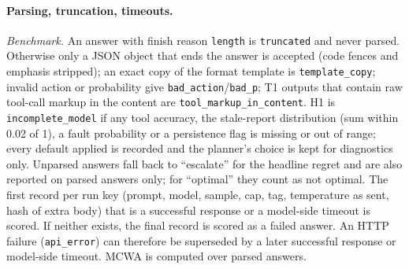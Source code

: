 \paragraph{Parsing, truncation, timeouts.}
\emph{Benchmark.} An answer with finish reason \texttt{length} is \texttt{truncated} and never parsed. Otherwise only a JSON object that ends the answer is accepted (code fences and emphasis stripped); an exact copy of the format template is \texttt{template\_copy}; invalid action or probability give \texttt{bad\_action}/\texttt{bad\_p}; T1 outputs that contain raw tool-call markup in the content are \texttt{tool\_markup\_in\_content}.
H1 is \texttt{incomplete\_model} if any tool accuracy, the stale-report distribution (sum within 0.02 of 1), a fault probability or a persistence flag is missing or out of range; every default applied is recorded and the planner's choice is kept for diagnostics only.
Unparsed answers fall back to ``escalate'' for the headline regret and are also reported on parsed answers only; for ``optimal'' they count as not optimal.
The first record per run key (prompt, model, sample, cap, tag, temperature as sent, hash of extra body) that is a successful response or a model-side timeout is scored. If neither exists, the final record is scored as a failed answer. An HTTP failure (\texttt{api\_error}) can therefore be superseded by a later successful response or model-side timeout. MCWA is computed over parsed answers.

